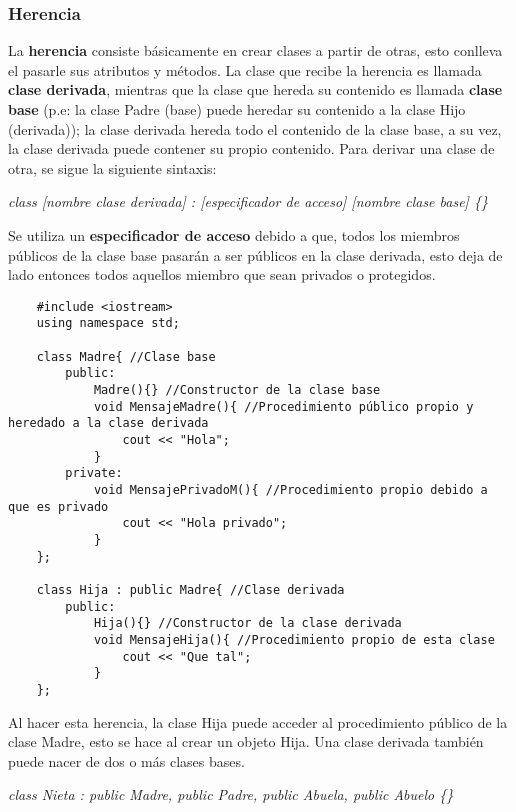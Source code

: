 \subsubsection{Herencia}
\hspace{0.55cm}La \textbf{herencia} consiste básicamente en crear clases a partir de otras, esto conlleva el pasarle sus atributos y métodos. La clase que recibe la herencia es llamada \textbf{clase derivada}, mientras que la clase que hereda su contenido es llamada \textbf{clase base} (p.e: la clase Padre (base) puede heredar su contenido a la clase Hijo (derivada)); la clase derivada hereda todo el contenido de la clase base, a su vez, la clase derivada puede contener su propio contenido. Para derivar una clase de otra, se sigue la siguiente sintaxis:
\begin{center}
    \textit{class [nombre clase derivada] : [especificador de acceso] [nombre clase base] \{\}}
\end{center}

Se utiliza un \textbf{especificador de acceso} debido a que, todos los miembros públicos de la clase base pasarán a ser públicos en la clase derivada, esto deja de lado entonces todos aquellos miembro que sean privados o protegidos.
\begin{lstlisting}
    #include <iostream>
    using namespace std;
    
    class Madre{ //Clase base
        public:
            Madre(){} //Constructor de la clase base
            void MensajeMadre(){ //Procedimiento público propio y heredado a la clase derivada
                cout << "Hola";
            }
        private:
            void MensajePrivadoM(){ //Procedimiento propio debido a que es privado
                cout << "Hola privado";
            }
    };
    
    class Hija : public Madre{ //Clase derivada
        public:
            Hija(){} //Constructor de la clase derivada
            void MensajeHija(){ //Procedimiento propio de esta clase
                cout << "Que tal";
            }
    };
\end{lstlisting}

Al hacer esta herencia, la clase Hija puede acceder al procedimiento público de la clase Madre, esto se hace al crear un objeto Hija. Una clase derivada también puede nacer de dos o más clases bases.
\begin{center}
    \textit{class Nieta : public Madre, public Padre, public Abuela, public Abuelo \{\}}
\end{center}

